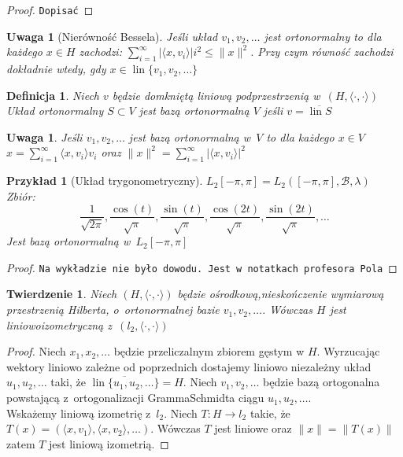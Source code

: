 \documentclass[11pt]{mwrep}
\renewcommand{\[}{\begin{equation}}
\renewcommand{\]}{\end{equation}}
\newcommand{\lin}{\operatorname{lin}}
\newcommand{\scal}{\langle \cdot,\cdot \rangle}
\newtheorem{twr}[subsection]{Twierdzenie}%
\newtheorem{uwaga}[subsection]{Uwaga}
\newtheorem{de}[subsection]{Definicja}
\newtheorem{ex}[subsection]{Przykład}
\begin{document}
\begin{proof}
	\texttt{Dopisać}
\end{proof}

\begin{uwaga}[Nierówność Bessela]
	Jeśli układ $v_1, v_2 ,\ldots$ jest ortonormalny to dla każdego $x\in H$ zachodzi:
	$\sum_{i=1}^{\infty} |\langle x,v_i \rangle|i^2\le \|x\|^2$. Przy czym równość zachodzi dokładnie wtedy, gdy $x\in \lin\{v_1,v_2,\ldots\}$
\end{uwaga}
\begin{de}
	Niech $v$ będzie domkniętą liniową podprzestrzenią w~$(H,\scal)$ 
	Układ ortonormalny $S \subset V$ jest bazą ortonormalną $V$ jeśli $v=\overline{\lin S}$ 
\end{de}
\begin{uwaga}
	Jeśli $v_1, v_2,\ldots$ jest bazą ortonormalną w~$V$ to dla każdego $x \in V$ 
	$x = \sum_{i=1}^{\infty}\langle x,v_i \rangle v_i $ oraz $\|x\|^2 = \sum_{i=1}^{\infty}|\langle x,v_i \rangle|^2$ 
\end{uwaga}
\begin{ex}[Układ trygonometryczny]
	$L_2[-\pi,\pi] = L_2([-\pi,\pi], \mathcal{B},\lambda)$ 
	Zbiór: 
	$$\frac{1}{\sqrt{2\pi}},\frac{\cos(t)}{\sqrt{\pi}},\frac{\sin(t)}{\sqrt{\pi}}, \frac{\cos(2t)}{\sqrt{\pi}}, \frac{\sin(2t)}{\sqrt{\pi}},\ldots$$
	Jest bazą ortonormalną w~$L_2 [-\pi,\pi]$ 
\end{ex}
\begin{proof}
	\texttt{Na wykładzie nie było dowodu. Jest w~notatkach profesora Pola}
\end{proof}
\begin{twr}
	Niech $(H,\scal)$ będzie ośrodkową,nieskończenie wymiarową przestrzenią Hilberta, o~ortonormalnej bazie $v_1,v_2, \ldots$. Wówczas $H$ jest liniowo\dywiz izometryczną z~$(l_2,\scal)$ 
\end{twr}
\begin{proof}
	Niech $x_1, x_2, \ldots$ będzie przeliczalnym zbiorem gęstym w $H$. 
	Wyrzucając wektory liniowo zależne od poprzednich dostajemy liniowo niezależny układ $u_1,u_2, \ldots$ taki, że $\overline{\lin \{u_1,u_2,\ldots\}} = H$.
	Niech $v_1, v_2, \ldots$ będzie bazą ortogonalna powstającą z~ortogonalizacji Gramma\dywiz Schmidta ciągu $u_1, u_2, \ldots$. \\
	Wskażemy liniową izometrię z~$l_2$.
	Niech $T:H\to l_2$ takie, że $T(x) = (\langle x,v_1 \rangle, \langle x,v_2 \rangle,\ldots)$. Wówczas $T$ jest liniowe oraz $\|x\|=\|T(x)\|$ 
	zatem $T$ jest liniową izometrią.
\end{proof}
\end{document}
